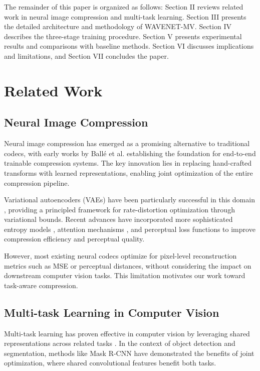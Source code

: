 \documentclass[conference]{IEEEtran}
\begin{document}
The remainder of this paper is organized as follows: Section II reviews related work in neural image compression and multi-task learning. Section III presents the detailed architecture and methodology of WAVENET-MV. Section IV describes the three-stage training procedure. Section V presents experimental results and comparisons with baseline methods. Section VI discusses implications and limitations, and Section VII concludes the paper.

\section{Related Work}

\subsection{Neural Image Compression}

Neural image compression has emerged as a promising alternative to traditional codecs, with early works by Ballé et al. \cite{balle2016end} establishing the foundation for end-to-end trainable compression systems. The key innovation lies in replacing hand-crafted transforms with learned representations, enabling joint optimization of the entire compression pipeline.

Variational autoencoders (VAEs) have been particularly successful in this domain \cite{balle2018variational}, providing a principled framework for rate-distortion optimization through variational bounds. Recent advances have incorporated more sophisticated entropy models \cite{minnen2018joint}, attention mechanisms \cite{cheng2020learned}, and perceptual loss functions \cite{agustsson2019generative} to improve compression efficiency and perceptual quality.

However, most existing neural codecs optimize for pixel-level reconstruction metrics such as MSE or perceptual distances, without considering the impact on downstream computer vision tasks. This limitation motivates our work toward task-aware compression.

\subsection{Multi-task Learning in Computer Vision}

Multi-task learning has proven effective in computer vision by leveraging shared representations across related tasks \cite{ruder2017overview}. In the context of object detection and segmentation, methods like Mask R-CNN \cite{he2017mask} have demonstrated the benefits of joint optimization, where shared convolutional features benefit both tasks.
\end{document}
